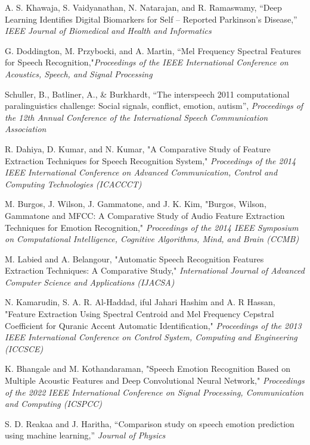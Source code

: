 \documentclass[conference]{IEEEtran}
\begin{document}
\begin{thebibliography}{00}

 A. S. Khawaja, S. Vaidyanathan, N.  Natarajan, and R. Ramaswamy, “Deep Learning Identifies Digital Biomarkers for Self – Reported Parkinson’s Disease,” \emph{IEEE Journal of Biomedical and Health and Informatics}

 G. Doddington, M. Przybocki, and A. Martin, “Mel Frequency Spectral Features for Speech Recognition,"\emph{Proceedings of the IEEE International Conference on Acoustics, Speech, and Signal Processing}

 Schuller, B., Batliner, A., & Burkhardt, “The interspeech 2011 computational paralinguistics challenge: Social signals, conflict, emotion, autism”, \emph{Proceedings of the 12th Annual Conference of the International Speech Communication Association}

 R. Dahiya, D. Kumar, and N. Kumar, "A Comparative Study of Feature Extraction Techniques for Speech Recognition System," \emph{Proceedings of the 2014 IEEE International Conference on Advanced Communication, Control and Computing Technologies (ICACCCT)}

 M. Burgos, J. Wilson, J. Gammatone, and J. K. Kim, "Burgos, Wilson, Gammatone and MFCC: A Comparative Study of Audio Feature Extraction Techniques for Emotion Recognition," \emph{Proceedings of the 2014 IEEE Symposium on Computational Intelligence, Cognitive Algorithms, Mind, and Brain (CCMB)}

 M. Labied and A. Belangour, "Automatic Speech Recognition Features Extraction Techniques: A Comparative Study," \emph{International Journal of Advanced Computer Science and Applications (IJACSA)}

 N. Kamarudin, S. A. R. Al-Haddad, iful Jahari Hashim and A. R Hassan, "Feature Extraction Using Spectral Centroid and Mel Frequency Cepstral Coefficient for Quranic Accent Automatic Identification," \emph{Proceedings of the 2013 IEEE International Conference on Control System, Computing and Engineering (ICCSCE)}

 K. Bhangale and M. Kothandaraman, "Speech Emotion Recognition Based on Multiple Acoustic Features and Deep Convolutional Neural Network," \emph{Proceedings of the 2022 IEEE International Conference on Signal Processing, Communication and Computing (ICSPCC)}

 S. D. Reakaa and J. Haritha, “Comparison study on speech emotion prediction using machine learning,” \emph{Journal of Physics}


\end{thebibliography}
\end{document}
